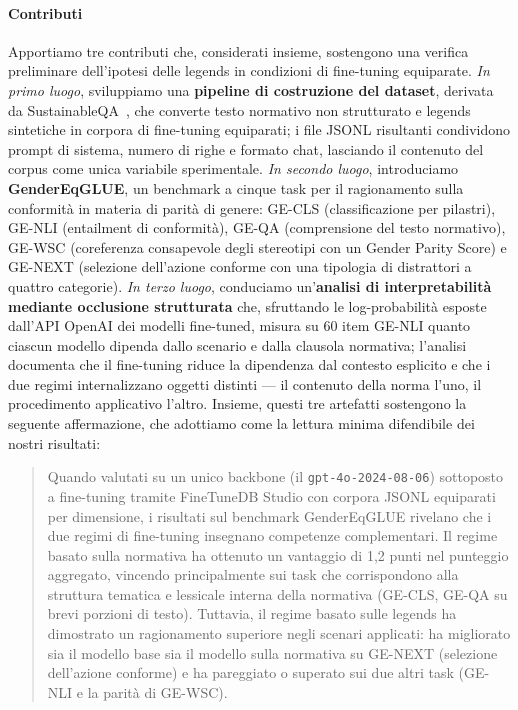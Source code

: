 \documentclass[pdflatex, sn-apa]{sn-jnl}%
\theoremstyle{thmstyleone}%
\theoremstyle{thmstyletwo}%
\theoremstyle{thmstylethree}%
\begin{document}
\paragraph{Contributi}
Apportiamo tre contributi che, considerati insieme, sostengono una verifica
preliminare dell'ipotesi delle legends in condizioni di fine-tuning equiparate.
\emph{In primo luogo}, sviluppiamo una \textbf{pipeline di costruzione del
dataset}, derivata da SustainableQA~\citep{wattenberg2025sustainableqa}, che
converte testo normativo non strutturato e legends sintetiche in corpora di
fine-tuning equiparati; i file JSONL risultanti condividono prompt di sistema,
numero di righe e formato chat, lasciando il contenuto del corpus come unica
variabile sperimentale. \emph{In secondo luogo}, introduciamo
\textbf{GenderEqGLUE}, un benchmark a cinque task per il ragionamento sulla
conformità in materia di parità di genere: GE-CLS (classificazione per pilastri),
GE-NLI (entailment di conformità), GE-QA (comprensione del testo normativo),
GE-WSC (coreferenza consapevole degli stereotipi con un Gender Parity Score) e
GE-NEXT (selezione dell'azione conforme con una tipologia di distrattori a quattro
categorie). \emph{In terzo luogo}, conduciamo un'\textbf{analisi di
interpretabilità mediante occlusione strutturata} che, sfruttando le
log-probabilità esposte dall'API OpenAI dei modelli fine-tuned, misura su 60 item
GE-NLI quanto ciascun modello dipenda dallo scenario e dalla clausola normativa;
l'analisi documenta che il fine-tuning riduce la dipendenza dal contesto esplicito
e che i due regimi internalizzano oggetti distinti --- il contenuto della norma
l'uno, il procedimento applicativo l'altro.
Insieme, questi tre artefatti sostengono la seguente affermazione, che adottiamo
come la lettura minima difendibile dei nostri risultati:

\begin{quote}
Quando valutati su un unico backbone (il \texttt{gpt-4o-2024-08-06}) sottoposto a
fine-tuning tramite FineTuneDB Studio con corpora JSONL equiparati per
dimensione, i risultati sul benchmark GenderEqGLUE rivelano che i due regimi di
fine-tuning insegnano competenze complementari. Il regime basato sulla normativa
ha ottenuto un vantaggio di 1,2 punti nel punteggio aggregato, vincendo
principalmente sui task che corrispondono alla struttura tematica e lessicale
interna della normativa (GE-CLS, GE-QA su brevi porzioni di testo). Tuttavia, il
regime basato sulle legends ha dimostrato un ragionamento superiore negli scenari
applicati: ha migliorato sia il modello base sia il modello sulla normativa su
GE-NEXT (selezione dell'azione conforme) e ha pareggiato o superato sui due altri
task (GE-NLI e la parità di GE-WSC).
\end{quote}
 
\end{document}
